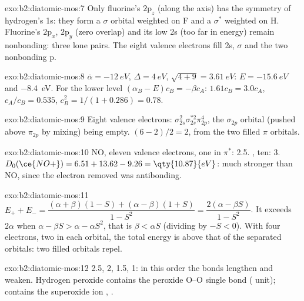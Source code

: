 \begin{solution}{exo:b2:diatomic-mos:7}
Only fluorine's $2\mathrm p_z$ (along the axis) has the symmetry of hydrogen's 1s:
they form a $\sigma$ orbital weighted on F and a $\sigma^*$ weighted on H. Fluorine's
$2\mathrm p_x$, $2\mathrm p_y$ (zero overlap) and its low 2s (too far in energy)
remain nonbonding: three lone pairs. The eight valence electrons fill 2s, $\sigma$
and the two nonbonding p.
\end{solution}

\begin{solution}{exo:b2:diatomic-mos:8}
$\bar\alpha = \qty{-12}{eV}$, $\Delta = \qty{4}{eV}$, $\sqrt{4 + 9} = \qty{3.61}{eV}$:
$E = \qty{-15.6}{eV}$ and \qty{-8.4}{eV}. For the lower level $(\alpha_B - E)c_B = -\beta
c_A$: $1.61c_B = 3.0c_A$, $c_A/c_B = 0.535$, $c_B^2 = 1/(1 + 0.286) = 0.78$.
\end{solution}

\begin{solution}{exo:b2:diatomic-mos:9}
Eight valence electrons: $\sigma_{2s}^2\sigma_{2s}^{*2}\pi_{2p}^4$, the $\sigma_{2p}$ orbital
(pushed above $\pi_{2p}$ by mixing) being empty.  $(6 - 2)/2 = 2$, from the
two filled $\pi$ orbitals.
\end{solution}

\begin{solution}{exo:b2:diatomic-mos:10}
NO, eleven valence electrons, one in $\pi^*$:  2.5. , ten: 
3. $D_0(\ce{NO+}) = 6.51 + 13.62 - 9.26 = \qty{10.87}{eV}$: much stronger than NO, since
the electron removed was antibonding.
\end{solution}

\begin{solution}{exo:b2:diatomic-mos:11}
$E_+ + E_- = \dfrac{(\alpha + \beta)(1 - S) + (\alpha - \beta)(1 + S)}{1 - S^2} = \dfrac{2(\alpha -
\beta S)}{1 - S^2}$. It exceeds $2\alpha$ when $\alpha - \beta S > \alpha - \alpha S^2$, that is
$\beta < \alpha S$ (dividing by $-S < 0$). With four electrons, two in each orbital, the
total energy is above that of the separated orbitals: two filled orbitals repel.
\end{solution}

\begin{solution}{exo:b2:diatomic-mos:12}
 2.5, 2, 1.5, 1: in this order the bonds lengthen and weaken. Hydrogen
peroxide contains the peroxide O--O single bond ( unit);  contains
the superoxide ion , .
\end{solution}

